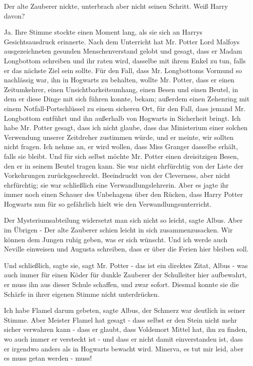 Der alte Zauberer nickte, unterbrach aber nicht seinen Schritt. \glqq Weiß Harry
davon?\grqq{}

\glqq Ja.\grqq{} Ihre Stimme stockte einen Moment lang, als sie sich an Harrys
Gesichtsausdruck erinnerte. \glqq Nach dem Unterricht hat Mr. Potter Lord
Malfoys ausgezeichneten gesunden Menschenverstand gelobt und gesagt, dass er
Madam Longbottom schreiben und ihr raten wird, dasselbe mit ihrem Enkel zu tun,
falls er das nächste Ziel sein sollte. Für den Fall, dass Mr. Longbottoms
Vormund so nachlässig war, ihn in Hogwarts zu behalten, wollte Mr. Potter, dass
er einen Zeitumkehrer, einen Unsichtbarkeitsumhang, einen Besen und einen
Beutel, in dem er diese Dinge mit sich führen konnte, bekam; außerdem einen
Zehenring mit einem Notfall-Portschlüssel zu einem sicheren Ort, für den Fall,
dass jemand Mr. Longbottom entführt und ihn außerhalb von Hogwarts in Sicherheit
bringt. Ich habe Mr. Potter gesagt, dass ich nicht glaube, dass das Ministerium
einer solchen Verwendung unserer Zeitdreher zustimmen würde, und er meinte, wir
sollten nicht fragen. Ich nehme an, er wird wollen, dass Miss Granger dasselbe
erhält, falls sie bleibt. Und für sich selbst möchte Mr. Potter einen
dreisitzigen Besen, den er in seinem Beutel tragen kann.\grqq{} Sie war nicht
ehrfürchtig von der Liste der Vorkehrungen zurückgeschreckt. Beeindruckt von der
Cleverness, aber nicht ehrfürchtig; sie war schließlich eine
Verwandlungslehrerin. Aber es jagte ihr immer noch einen Schauer des Unbehagens
über den Rücken, dass Harry Potter Hogwarts nun für so gefährlich hielt wie den
Verwandlungsunterricht.

\glqq Der Mysteriumsabteilung widersetzt man sich nicht so leicht\grqq{}, sagte
Albus. \glqq Aber im Übrigen -\grqq{} Der alte Zauberer schien leicht in sich
zusammenzusacken. \glqq Wir können dem Jungen ruhig geben, was er sich wünscht.
Und ich werde auch Neville einweisen und Augusta schreiben, dass er über die
Ferien hier bleiben soll.\grqq{}

\glqq Und schließlich\grqq{}, sagte sie, \glqq sagt Mr. Potter - das ist ein
direktes Zitat, Albus - was auch immer für einen Köder für dunkle Zauberer der
Schulleiter hier aufbewahrt, er muss ihn aus dieser Schule schaffen, und zwar
sofort.\grqq{} Diesmal konnte sie die Schärfe in ihrer eigenen Stimme nicht
unterdrücken.

\glqq Ich habe Flamel darum gebeten\grqq{}, sagte Albus, der Schmerz war
deutlich in seiner Stimme. \glqq Aber Meister Flamel hat gesagt - dass selbst er
den Stein nicht mehr sicher verwahren kann - dass er glaubt, dass Voldemort
Mittel hat, ihn zu finden, wo auch immer er versteckt ist - und dass er nicht
damit einverstanden ist, dass er irgendwo anders als in Hogwarts bewacht wird.
Minerva, es tut mir leid, aber es muss getan werden - muss!\grqq{}

